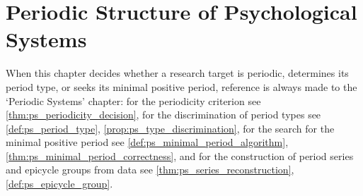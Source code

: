 \chapter{Periodic Structure of Psychological Systems}

\begin{remark}\label{rem:psych_ps_hook}
When this chapter decides whether a research target is periodic, determines its period type, or seeks its minimal positive period, reference is always made to the `Periodic Systems' chapter:
for the periodicity criterion see \cref{thm:ps_periodicity_decision},
for the discrimination of period types see \cref{def:ps_period_type}, \cref{prop:ps_type_discrimination},
for the search for the minimal positive period see \cref{def:ps_minimal_period_algorithm}, \cref{thm:ps_minimal_period_correctness},
and for the construction of period series and epicycle groups from data see \cref{thm:ps_series_reconstruction}, \cref{def:ps_epicycle_group}.
\end{remark}

